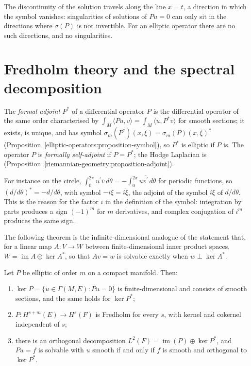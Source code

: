 The discontinuity of the solution travels along the line $x = t$, a direction in which the symbol vanishes: singularities of solutions of $Pu = 0$ can only sit in the directions where
$\sigma(P)$ is not invertible. For an elliptic operator there are no such directions, and no singularities.

\section{Fredholm theory and the spectral decomposition}\label{elliptic-operators:section-fredholm}

\begin{definition}\label{elliptic-operators:definition-formal-adjoint}
The \emph{formal adjoint} $P^*$ of a differential operator $P$ is the differential operator of the same order characterised by $\int_M\langle Pu, v\rangle = \int_M\langle u, P^*v\rangle$ for smooth sections;
it exists, is unique, and has symbol $\sigma_m(P^*)(x, \xi) = \sigma_m(P)(x, \xi)^*$ (Proposition~\ref{elliptic-operators:proposition-symbol}), so $P^*$ is elliptic if $P$ is. The operator $P$ is \emph{formally self-adjoint} if $P = P^*$; the Hodge Laplacian
is (Proposition~\ref{riemannian-geometry:proposition-adjoint}).
\end{definition}

For instance on the circle, $\int_0^{2\pi}u^{\prime}\bar v\,d\theta = -\int_0^{2\pi}u\overline{v^{\prime}}\,d\theta$ for periodic functions, so $(d/d\theta)^* = -d/d\theta$, with symbol $-i\xi = \overline{i\xi}$, the
adjoint of the symbol $i\xi$ of $d/d\theta$. This is the reason for the factor $i$ in the definition of the symbol: integration by parts produces a sign $(-1)^m$ for $m$ derivatives, and complex
conjugation of $i^m$ produces the same sign.

The following theorem is the infinite-dimensional analogue of the statement that, for a linear map $A \colon V \to W$ between finite-dimensional inner product spaces, $W = \operatorname{im}A \oplus \ker A^*$, so
that $Av = w$ is solvable exactly when $w \perp \ker A^*$.

\begin{theorem}\label{elliptic-operators:theorem-fredholm}
Let $P$ be elliptic of order $m$ on a compact manifold. Then:
\begin{enumerate}
\item $\ker P = \{u \in \Gamma(M, E) : Pu = 0\}$ is finite-dimensional and consists of smooth sections, and the same holds for $\ker P^*$;
\item $P \colon H^{s+m}(E) \to H^s(F)$ is Fredholm for every $s$, with kernel and cokernel independent of $s$;
\item there is an orthogonal decomposition $L^2(F) = \operatorname{im}(P) \oplus \ker P^*$, and $Pu = f$ is solvable with $u$ smooth if and only if $f$ is smooth and orthogonal to $\ker P^*$.
\end{enumerate}
\end{theorem}

